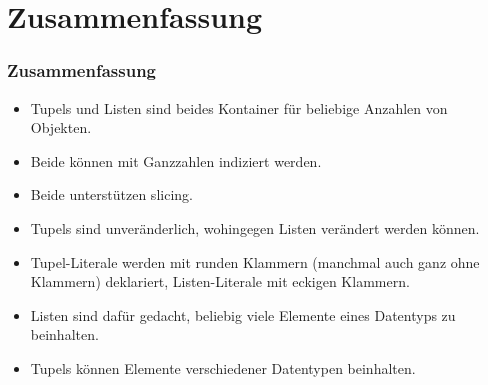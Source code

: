\documentclass[aspectratio=169,mathserif,notheorems]{beamer}%
\begin{document}
\section{Zusammenfassung}%
%
\begin{frame}%
\frametitle{Zusammenfassung}%
\begin{itemize}%
\item Tupels und Listen sind beides Kontainer für beliebige Anzahlen von Objekten.%
%
\item<2-> Beide können mit Ganzzahlen indiziert werden.%
%
\item<3-> Beide unterstützen slicing.%
%
\item<4-> Tupels sind unveränderlich, wohingegen Listen verändert werden können.%
%
\item<5-> Tupel-Literale werden mit runden Klammern (manchmal auch ganz ohne Klammern) deklariert, Listen-Literale mit eckigen Klammern.%
%
\item<6-> Listen sind dafür gedacht, beliebig viele Elemente eines Datentyps zu beinhalten.%
%
\item<7-> Tupels können Elemente verschiedener Datentypen beinhalten.%
%
\end{itemize}%
\end{frame}%
%
\endPresentation%
\end{document}

